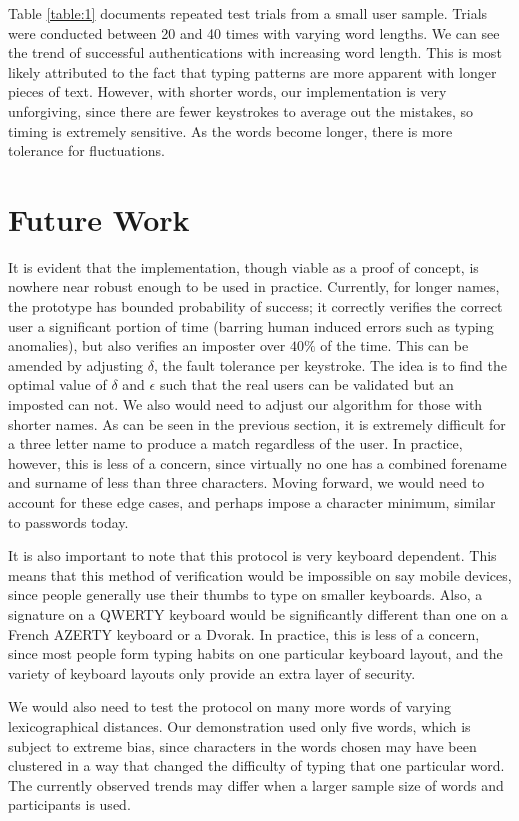 \documentclass[11pt]{article}
\begin{document}
Table \ref{table:1} documents repeated test trials from a small user sample.  Trials were conducted between 20 and 40 times with varying word lengths.  We can see the trend of successful authentications with increasing word length.  This is most likely attributed to the fact that typing patterns are more apparent with longer pieces of text.  However, with shorter words, our implementation is very unforgiving, since there are fewer keystrokes to average out the mistakes, so timing is extremely sensitive.   As the words become longer, there is more tolerance for fluctuations.


\section{Future Work}
\label{sec:future}
It is evident that the implementation, though viable as a proof of concept, is nowhere near robust enough to be used in practice.  Currently, for longer names, the prototype has bounded probability of success; it correctly verifies the correct user a significant portion of time (barring human induced errors such as typing anomalies), but also verifies an imposter over $40\%$ of the time.  This can be amended by adjusting $\delta$, the fault tolerance per keystroke.  The idea is to find the optimal value of $\delta$ and $\epsilon$ such that the real users can be validated but an imposted can not.  We also would need to adjust our algorithm for those with shorter names.  As can be seen in the previous section, it is extremely difficult for a three letter name to produce a match regardless of the user.  In practice, however, this is less of a concern, since virtually no one has a combined forename and surname of less than three characters. Moving forward, we would need to account for these edge cases, and perhaps impose a character minimum, similar to passwords today.

It is also important to note that this protocol is very keyboard dependent. This means that this method of verification would be impossible on say mobile devices, since people generally use their thumbs to type on smaller keyboards.  Also, a signature on a QWERTY keyboard would be significantly different than one on a French AZERTY keyboard or a Dvorak. In practice, this is less of a concern, since most people form typing habits on one particular keyboard layout, and the variety of keyboard layouts only provide an extra layer of security.

We would also need to test the protocol on many more words of varying lexicographical distances. Our demonstration used only five words, which is subject to extreme bias, since characters in the words chosen may have been clustered in a way that changed the difficulty of typing that one particular word.  The currently observed trends may differ when a larger sample size of words and participants is used.
\end{document}
